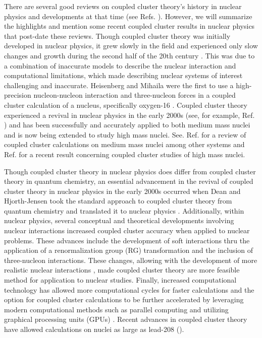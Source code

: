 There are several good reviews on coupled cluster theory's history in nuclear physics and developments at that time (see Refs. \cite{Ref147, Ref68, Ref16}). However, we will summarize the highlights and mention some recent coupled cluster results in nuclear physics that post-date these reviews. Though coupled cluster theory was initially developed in nuclear physics, it grew slowly in the field and experienced only slow changes and growth during the second half of the 20th century \cite{Ref68}. This was due to a combination of inaccurate models to describe the nuclear interaction and computational limitations, which made describing nuclear systems of interest challenging and inaccurate. Heisenberg and Mihaila were the first to use a high-precision nucleon-nucleon interaction and three-nucleon forces in a coupled cluster calculation of a nucleus, specifically oxygen-16 \cite{Ref154}. Coupled cluster theory experienced a revival in nuclear physics in the early 2000s (see, for example, Ref. \cite{Ref148}) and has been successfully and accurately applied to both medium mass nuclei and is now being extended to study high mass nuclei. See. Ref. \cite{Ref16} for a review of coupled cluster calculations on medium mass nuclei among other systems and Ref. \cite{Ref20} for a recent result concerning coupled cluster studies of high mass nuclei.  

Though coupled cluster theory in nuclear physics does differ from coupled cluster theory in quantum chemistry, an essential advancement in the revival of coupled cluster theory in nuclear physics in the early 2000s occurred when Dean and Hjorth-Jensen took the standard approach to coupled cluster theory from quantum chemistry and translated it to nuclear physics \cite{Ref148}. Additionally, within nuclear physics, several conceptual and theoretical developments involving nuclear interactions increased coupled cluster accuracy when applied to nuclear problems. These advances include the development of soft interactions thru the application of a renormalization group (RG) transformation and the inclusion of three-nucleon interactions. These changes, allowing with the development of more realistic nuclear interactions \cite{Ref42,Ref44,Ref45,Ref46,Ref59, Ref101, Ref200, Ref201}, made coupled cluster theory are more feasible method for application to nuclear studies. Finally, increased computational technology has allowed more computational cycles for faster calculations and the option for coupled cluster calculations to be further accelerated by leveraging modern computational methods such as parallel computing and utilizing graphical processing units (GPUs) \cite{Ref16,Ref82}. Recent advances in coupled cluster theory have allowed calculations on nuclei as large as lead-208 (\cite{Ref20}).

